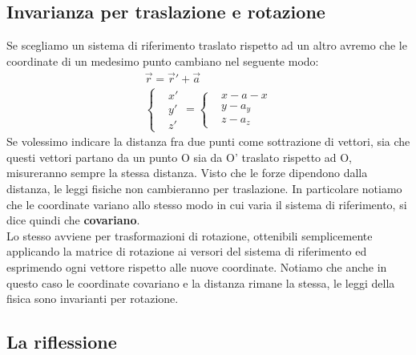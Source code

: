 \documentclass[10pt,a4paper]{article}
\begin{document}
\subsection{Invarianza per traslazione e rotazione}
Se scegliamo un sistema di riferimento traslato rispetto ad un altro avremo che le coordinate di un medesimo punto cambiano nel seguente modo:  
\begin{align*}
\vec{r} = \vec{r}'+ \vec{a}\\
\begin{cases}
	&x'\\
	&y'\\
	&z'
\end{cases}
=
\begin{cases}
	&x-a-x\\
	&y-a_y\\
	&z-a_z
\end{cases}
\end{align*}
Se volessimo indicare la distanza fra due punti come sottrazione di vettori, sia che questi vettori partano da un punto O sia da O' traslato rispetto ad O, misureranno sempre la stessa distanza. Visto che le forze dipendono dalla distanza, le leggi fisiche non cambieranno per traslazione. In particolare notiamo che le coordinate variano allo stesso modo in cui varia il sistema di riferimento, si dice quindi che \textbf{covariano}.\\
Lo stesso avviene per trasformazioni di rotazione, ottenibili semplicemente applicando la matrice di rotazione ai versori del sistema di riferimento ed esprimendo ogni vettore rispetto alle nuove coordinate. Notiamo che anche in questo caso le coordinate covariano e la distanza rimane la stessa, le leggi della fisica sono invarianti per rotazione. 
\subsection{La riflessione}
\end{document}
